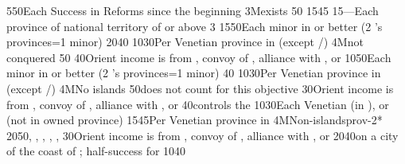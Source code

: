 {5}{50}{Each Success in Reforms since the beginning}%
%
\EUobjective3M{\payscrimee exists}{}%
{}{50}{}%
%
%
{15}{45}{}%
%
%
{15}{---}{Each province of national territory of  or
   above 3}%
%
 
%
%
{15}{50}{Each minor in \EG or better (2 's provinces=1 minor)}%
%
%
{20}{40}{}%
%
%
{10}{30}{Per Venetian province in \regionBalkans (except
  \provinceHellas/\provinceMoreas)}%
%
\EUobjective4M{\paysmamelouks not conquered}{}%
{}{50}{}%
%
%
{}{40}{Orient income is from , convoy of \villeIzmir,
  alliance with \paysaden, \paysoman or \paysgujarat}%
%
%
%
{10}{50}{Each minor in \EG or better (2 's provinces=1 minor)}%
%
%
{}{40}{}%
%
%
{10}{30}{Per Venetian province in \regionBalkans (except
  \provinceHellas/\provinceMoreas)}%
%
\EUobjective4M{No \TUR islands}{}%
{}{50}{\provinceRhodos does not count for this objective}%
%
%
{}{30}{Orient income is from , convoy of \villeIzmir,
  alliance with \paysaden, \paysoman or \paysgujarat}%
%
%
%
{}{40}{\paysmajeurVenise controls the }%
%
%
{10}{30}{Each Venetian \Presidio (in ), or \regionBalkans
  (not in owned province)}%
%
%
{15}{45}{Per Venetian province in \regionBalkans}%
%
\EUobjective4M{Non-\TUR islands}{prov-2*}%
{20}{50}{\provinceChypre, \provinceKreta, \provinceCyclades, \provinceCorfu,
  \provinceMalta, \provinceRhodos}%
%
%
%
{}{30}{Orient income is from , convoy of \villeIzmir,
  alliance with \paysaden, \paysoman or \paysgujarat}%
%
 
%
%
{20}{40}{\COL on a city of the coast of \continentIndia; half-success for
  \granderegionCeylan}%
%
%
{10}{40}{}%
%
%
